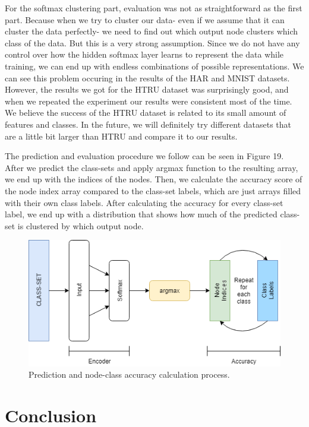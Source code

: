 \documentclass[journal]{IEEEtran}
\begin{document}
For the softmax clustering part, evaluation was not as straightforward as the first part. Because when we try to cluster our data- even if we assume that it can cluster the data perfectly- we need to find out which output node clusters which class of the data. But this is a very strong assumption. Since we do not have any control over how the hidden softmax layer learns to represent the data while training, we can end up with endless combinations of possible representations. We can see this problem occuring in the results of the HAR and MNIST datasets. However, the results we got for the HTRU dataset was surprisingly good, and when we repeated the experiment our results were consistent most of the time. We believe the success of the HTRU dataset is related to its small amount of features and classes. In the future, we will definitely try different datasets that are a little bit  larger than HTRU and compare it to our results.\par
The prediction and evaluation procedure we follow can be seen in Figure 19. After we predict the class-sets and apply argmax function to the resulting array, we end up with the indices of the nodes. Then, we calculate the accuracy score of the node index array compared to the class-set labels, which are just arrays filled with their own class labels. After calculating the accuracy for every class-set label, we end up with a distribution that shows how much of the predicted class-set is clustered by which output node.  
\begin{figure}[!htb]
  
    \includegraphics[width=\linewidth]{images/Model.png}
    \caption{Prediction and node-class accuracy calculation process.}\label{fig_model}
 
  \end{figure}

\section{Conclusion}
\end{document}
